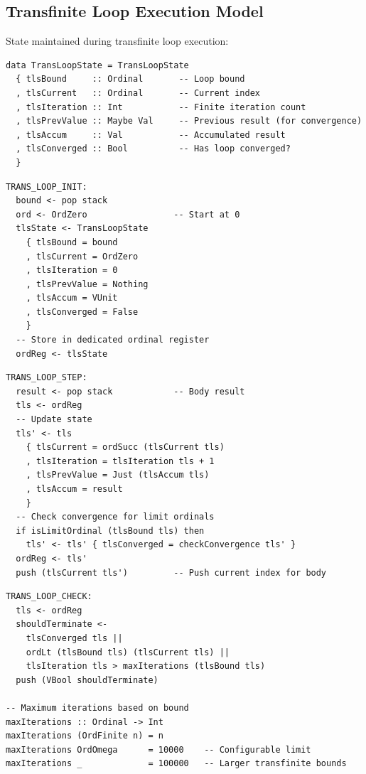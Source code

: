 \subsection{Transfinite Loop Execution Model}
\label{subsec:transfinite-loop-model}

\begin{definition}
\label{def:transfinite-loop-state}
State maintained during transfinite loop execution:
\begin{verbatim}
data TransLoopState = TransLoopState
  { tlsBound     :: Ordinal       -- Loop bound
  , tlsCurrent   :: Ordinal       -- Current index
  , tlsIteration :: Int           -- Finite iteration count
  , tlsPrevValue :: Maybe Val     -- Previous result (for convergence)
  , tlsAccum     :: Val           -- Accumulated result
  , tlsConverged :: Bool          -- Has loop converged?
  }
\end{verbatim}
\end{definition}

\begin{definition}
\label{def:trans-loop-init}
\begin{verbatim}
TRANS_LOOP_INIT:
  bound <- pop stack
  ord <- OrdZero                 -- Start at 0
  tlsState <- TransLoopState
    { tlsBound = bound
    , tlsCurrent = OrdZero
    , tlsIteration = 0
    , tlsPrevValue = Nothing
    , tlsAccum = VUnit
    , tlsConverged = False
    }
  -- Store in dedicated ordinal register
  ordReg <- tlsState
\end{verbatim}
\end{definition}

\begin{definition}
\label{def:trans-loop-step}
\begin{verbatim}
TRANS_LOOP_STEP:
  result <- pop stack            -- Body result
  tls <- ordReg
  -- Update state
  tls' <- tls
    { tlsCurrent = ordSucc (tlsCurrent tls)
    , tlsIteration = tlsIteration tls + 1
    , tlsPrevValue = Just (tlsAccum tls)
    , tlsAccum = result
    }
  -- Check convergence for limit ordinals
  if isLimitOrdinal (tlsBound tls) then
    tls' <- tls' { tlsConverged = checkConvergence tls' }
  ordReg <- tls'
  push (tlsCurrent tls')         -- Push current index for body
\end{verbatim}
\end{definition}

\begin{definition}
\label{def:trans-loop-check}
\begin{verbatim}
TRANS_LOOP_CHECK:
  tls <- ordReg
  shouldTerminate <-
    tlsConverged tls ||
    ordLt (tlsBound tls) (tlsCurrent tls) ||
    tlsIteration tls > maxIterations (tlsBound tls)
  push (VBool shouldTerminate)

-- Maximum iterations based on bound
maxIterations :: Ordinal -> Int
maxIterations (OrdFinite n) = n
maxIterations OrdOmega      = 10000    -- Configurable limit
maxIterations _             = 100000   -- Larger transfinite bounds
\end{verbatim}
\end{definition}

